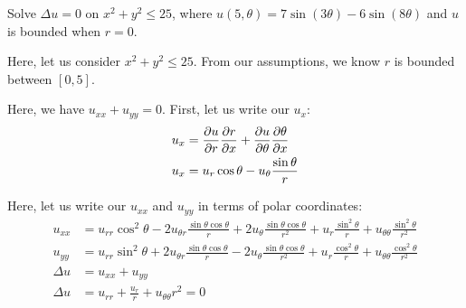 \item Solve $\Delta u = 0$ on $x^2 + y^2 \leq 25$, where $u(5, \theta) = 7 \sin(3 \theta) - 6 \sin(8 \theta)$ and $u$ is bounded when $r = 0$.

Here, let us consider $x^2 + y^2 \leq 25$. From our assumptions, we know $r$ is bounded between $[0, 5]$.

Here, we have $u_{xx} + u_{yy} = 0$. First, let us write our $u_x$:
%
\begin{align}
  u_x & = \frac{\partial u}{\partial r} \frac{\partial r}{\partial x} + \frac{\partial u}{\partial \theta} \frac{\partial \theta}{\partial x}\\
  u_x & = u_r \cos \theta - u_\theta \frac{\sin \theta}{r}
\end{align}

Here, let us write our $u_{xx}$ and $u_{yy}$ in terms of polar coordinates:
%
\begin{align}
  u_{xx} & = u_{rr} \cos^2 \theta
  - 2 u_{\theta r} \frac{\sin \theta \cos \theta}{r}
  + 2 u_\theta \frac{\sin \theta \cos \theta}{r^2}
  + u_r \frac{\sin^2 \theta}{r} + u_{\theta \theta} \frac{\sin^2 \theta}{r^2}\\
  u_{yy} &
  = u_{rr} \sin^2 \theta
  + 2u_{\theta r} \frac{\sin \theta \cos \theta}{r}
  - 2u_\theta \frac{\sin \theta \cos \theta}{r^2}
  + u_r \frac{\cos^2 \theta}{r}
  + u_{\theta \theta} \frac{\cos^2 \theta}{r^2}\\
  \Delta u & = u_{xx} + u_{yy}\\
  \Delta u & = u_{rr} + \frac{u_r}{r} + u_{\theta\theta}{r^2} = 0
\end{align}


